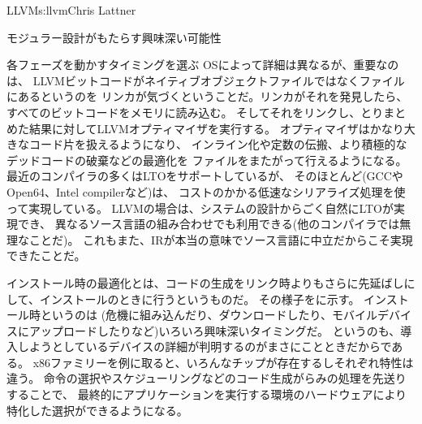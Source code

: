 \begin{aosachapter}{LLVM}{s:llvm}{Chris Lattner}
\begin{aosasect1}{モジュラー設計がもたらす興味深い可能性}
\begin{aosasect2}{各フェーズを動かすタイミングを選ぶ}
OSによって詳細は異なるが、重要なのは、
LLVMビットコードがネイティブオブジェクトファイルではなくファイルにあるというのを
リンカが気づくということだ。リンカがそれを発見したら、すべてのビットコードをメモリに読み込む。
そしてそれをリンクし、とりまとめた結果に対してLLVMオプティマイザを実行する。
オプティマイザはかなり大きなコード片を扱えるようになり、
インライン化や定数の伝搬、より積極的なデッドコードの破棄などの最適化を
ファイルをまたがって行えるようになる。最近のコンパイラの多くはLTOをサポートしているが、
そのほとんど(GCCやOpen64、Intel compilerなど)は、
コストのかかる低速なシリアライズ処理を使って実現している。
LLVMの場合は、システムの設計からごく自然にLTOが実現でき、
異なるソース言語の組み合わせでも利用できる(他のコンパイラでは無理なことだ)。
これもまた、IRが本当の意味でソース言語に中立だからこそ実現できたことだ。

インストール時の最適化とは、コードの生成をリンク時よりもさらに先延ばしにして、インストールのときに行うというものだ。
その様子をに示す。
インストール時というのは
(危機に組み込んだり、ダウンロードしたり、モバイルデバイスにアップロードしたりなど)いろいろ興味深いタイミングだ。
というのも、導入しようとしているデバイスの詳細が判明するのがまさにことときだからである。
x86ファミリーを例に取ると、いろんなチップが存在するしそれぞれ特性は違う。
命令の選択やスケジューリングなどのコード生成がらみの処理を先送りすることで、
最終的にアプリケーションを実行する環境のハードウェアにより特化した選択ができるようになる。


\end{aosasect2}
\end{aosasect1}
\end{aosachapter}
